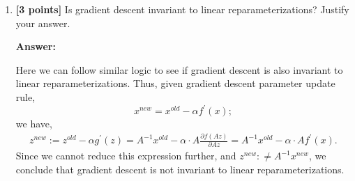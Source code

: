 \documentclass{article}
\begin{document}
\begin{enumerate}[label=\alph*)]


\item \textbf{[3 points]} Is gradient descent invariant to linear reparameterizations? Justify your answer.

\textbf{Answer:}


Here we can follow similar logic to see if gradient descent is also invariant to linear reparameterizations. Thus, given gradient descent parameter update rule,
\[
x^{new} = x^{old} - \alpha f^{\prime}(x);
\]
we have,
\begin{align*}
 z^{new} := z^{old} - \alpha g^{\prime}(z) = A^{-1}x^{old} - \alpha\cdot A\frac{\partial f(Az)}{\partial Az }  = A^{-1}x^{old} - \alpha \cdot A f^{\prime}(x).
\end{align*}
Since we cannot reduce this expression further, and $z^{new} :\neq A^{-1}x^{new}$, we conclude that gradient descent is not invariant to linear reparameterizations.
\end{enumerate}
\end{document}
